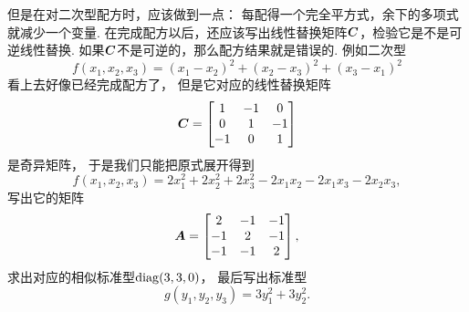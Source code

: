 但是在对二次型配方时，应该做到一点：
每配得一个完全平方式，余下的多项式就减少一个变量.
在完成配方以后，还应该写出线性替换矩阵\(\boldsymbol{C}\)，检验它是不是可逆线性替换.
如果\(\boldsymbol{C}\)不是可逆的，那么配方结果就是错误的.
例如二次型\begin{equation*}
	f(x_1,x_2,x_3) = (x_1-x_2)^2 + (x_2-x_3)^2 + (x_3-x_1)^2
\end{equation*}看上去好像已经完成配方了，
但是它对应的线性替换矩阵\begin{equation*}
	\boldsymbol{C} = \begin{bmatrix}
		1 & -1 & 0 \\
		0 & 1 & -1 \\
		-1 & 0 & 1 \\
	\end{bmatrix}
\end{equation*}是奇异矩阵，
于是我们只能把原式展开得到\begin{equation*}
	f(x_1,x_2,x_3)
	= 2 x_1^2 + 2 x_2^2 + 2 x_3^2
	- 2 x_1 x_2 - 2 x_1 x_3 - 2 x_2 x_3,
\end{equation*}
写出它的矩阵\begin{equation*}
	\boldsymbol{A} = \begin{bmatrix}
		2 & -1 & -1 \\
		-1 & 2 & -1 \\
		-1 & -1 & 2
	\end{bmatrix},
\end{equation*}
求出对应的相似标准型\(\operatorname{diag}(3,3,0)\)，
最后写出标准型\begin{equation*}
	g(y_1,y_2,y_3) = 3 y_1^2 + 3 y_2^2.
\end{equation*}

